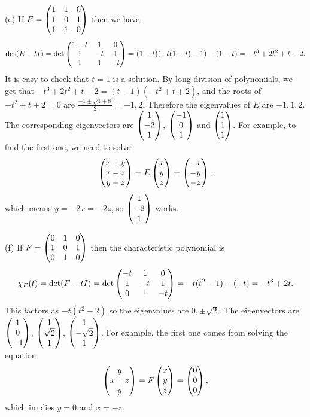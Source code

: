 \documentclass{article}
\begin{document}
\begin{Solution}
(e) If \(E=\begin{pmatrix} 1 & 1 & 0 \\ 1 & 0 & 1 \\ 1 & 1 & 0 \end{pmatrix}\) then we
have \[\det(E-tI)=\det\begin{pmatrix} 1-t & 1 & 0 \\ 1 & -t & 1 \\ 1 & 1 &
-t\end{pmatrix}=(1-t)(-t(1-t)-1)-(1-t)=-t^3+2t^2+t-2.\] It is easy to check
that \(t=1\) is a solution. By long division of polynomials, we get
that \(-t^3+2t^2+t-2=(t-1)(-t^2+t+2)\), and the roots of
\(-t^2+t+2=0\) are \(\frac{-1\pm\sqrt{1+8}}{2}=-1,2\). Therefore the
eigenvalues of \(E\) are \(-1,1,2\). The corresponding eigenvectors
are \(\begin{pmatrix} 1 \\ -2 \\ 1 \end{pmatrix}\), \(\begin{pmatrix} -1 \\ 0 \\ 1\end{pmatrix}\) and \(\begin{pmatrix} 1
\\ 1 \\ 1\end{pmatrix}\). For example, to find the first one, we need to solve
\[\begin{pmatrix} x+y \\ x+z \\ y+z\end{pmatrix}=E\begin{pmatrix} x \\ y \\ z \end{pmatrix}=\begin{pmatrix} -x \\ -y
\\ -z\end{pmatrix},\] which means \(y=-2x=-2z\), so \(\begin{pmatrix} 1 \\ -2 \\ 1\end{pmatrix}\)
works.


(f) If \(F=\begin{pmatrix} 0 & 1 & 0 \\ 1 & 0 & 1 \\ 0 & 1 & 0\end{pmatrix}\) then the
characteristic polynomial is \[\chi_F(t)=\det(F-tI)=\det\begin{pmatrix} -t & 1 &
0 \\ 1 & -t & 1 \\ 0 & 1 & -t\end{pmatrix}=-t(t^2-1)-(-t)=-t^3+2t.\] This
factors as \(-t(t^2-2)\) so the eigenvalues are \(0,\pm
\sqrt{2}\). The eigenvectors are \(\begin{pmatrix} 1 \\ 0 \\ -1\end{pmatrix}\), \(\begin{pmatrix} 1
\\ \sqrt{2}\\ 1\end{pmatrix}\), \(\begin{pmatrix} 1 \\ -\sqrt{2}\\ 1\end{pmatrix}\). For example,
the first one comes from solving the equation \[\begin{pmatrix} y \\ x+z
\\ y\end{pmatrix}=F\begin{pmatrix} x \\ y\\ z\end{pmatrix}=\begin{pmatrix} 0 \\ 0 \\ 0\end{pmatrix},\] which implies
\(y=0\) and \(x=-z\).


\end{Solution}
\end{document}
